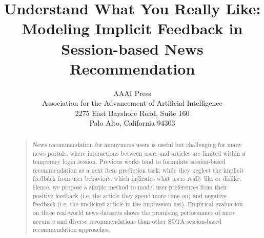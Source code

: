 \documentclass[letterpaper]{article}
\begin{document}
%
\title{Understand What You Really Like: \\ Modeling Implicit Feedback in Session-based News Recommendation}
\author{AAAI Press\\
Association for the Advancement of Artificial Intelligence\\
2275 East Bayshore Road, Suite 160\\
Palo Alto, California 94303\\
}
\maketitle
\begin{abstract}
\begin{quote}
    News recommendation for anonymous users is useful but challenging for many news portals, where interactions between users and articles are limited within a temporary login session. 
    Previous works tend to formulate session-based recommendation as a next item prediction task, while they neglect the implicit feedback from user behaviors, which indicates what users really like or dislike. 
    Hence, we propose a simple method to model user preferences from their positive feedback (i.e. the article they spend more time on) and negative feedback (i.e. the unclicked article in the impression list).
    Empirical evaluation on three real-world news datasets shows the promising performance of 
    more accurate and diverse recommendations than other SOTA session-based recommendation approaches.
\end{quote}
\end{abstract}








\normalem


\end{document}
